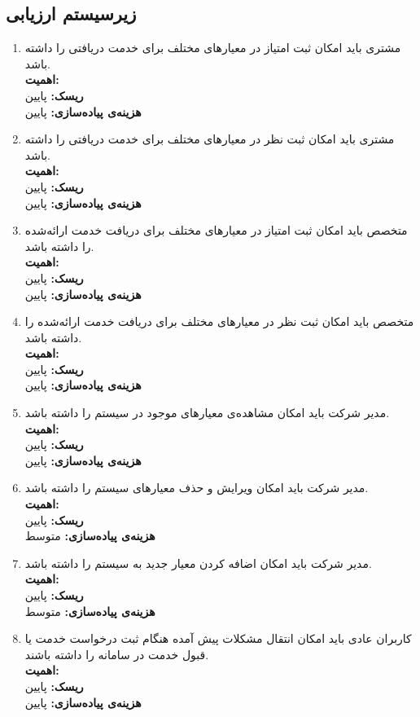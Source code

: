 \subsection{زیرسیستم ارزیابی}
\begin{enumerate}
	\item
مشتری باید امکان ثبت امتیاز در معیارهای مختلف برای خدمت دریافتی را داشته باشد.
\\
\textbf{اهمیت:} 
\\
\textbf{ریسک:} پایین
\\
\textbf{هزینه‌ی پیاده‌سازی:} پایین
	\item
مشتری باید امکان ثبت نظر در معیارهای مختلف برای خدمت دریافتی را داشته باشد.
\\
\textbf{اهمیت:} 
\\
\textbf{ریسک:} پایین
\\
\textbf{هزینه‌ی پیاده‌سازی:} پایین
	\item
متخصص باید امکان ثبت امتیاز در معیارهای مختلف برای دریافت خدمت ارائه‌شده را داشته باشد.
\\
\textbf{اهمیت:} 
\\
\textbf{ریسک:} پایین
\\
\textbf{هزینه‌ی پیاده‌سازی:} پایین
	\item
متخصص باید امکان ثبت نظر در معیارهای مختلف برای دریافت خدمت ارائه‌شده را داشته باشد.
\\
\textbf{اهمیت:} 
\\
\textbf{ریسک:} پایین
\\
\textbf{هزینه‌ی پیاده‌سازی:} پایین
	\item
مدیر شرکت باید امکان مشاهده‌ی معیارهای موجود در سیستم را داشته باشد.
\\
\textbf{اهمیت:} 
\\
\textbf{ریسک:} پایین
\\
\textbf{هزینه‌ی پیاده‌سازی:} پایین
	\item
مدیر شرکت باید امکان ویرایش و حذف معیارهای سیستم را داشته باشد.
\\
\textbf{اهمیت:} 
\\
\textbf{ریسک:} پایین
\\
\textbf{هزینه‌ی پیاده‌سازی:} متوسط

	\item
مدیر شرکت باید امکان اضافه کردن معیار جدید به سیستم را داشته باشد.
\\
\textbf{اهمیت:} 
\\
\textbf{ریسک:} پایین
\\
\textbf{هزینه‌ی پیاده‌سازی:} متوسط


	\item
کاربران عادی باید امکان انتقال مشکلات پیش آمده هنگام ثبت درخواست خدمت یا قبول خدمت در سامانه را داشته باشند.
\\
\textbf{اهمیت:} 
\\
\textbf{ریسک:} پایین
\\
\textbf{هزینه‌ی پیاده‌سازی:} پایین

\end{enumerate}

